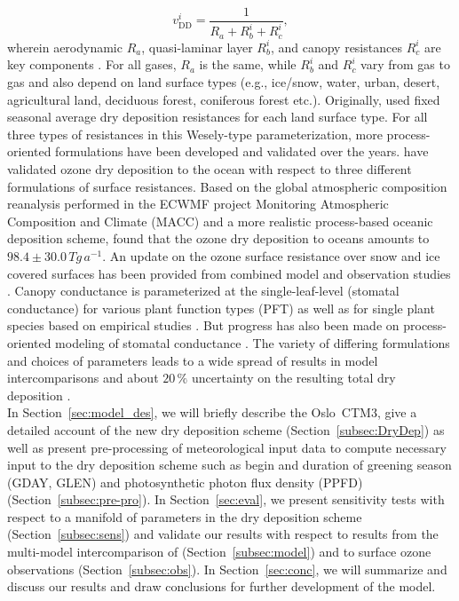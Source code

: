 \documentclass[gmd, manuscript]{copernicus}
\begin{document}
\begin{equation}
  v^i_\text{DD} = \frac{1}{R_a + R^i_b + R^i_c},
  \label{eq:drydep_velo}
\end{equation}
wherein aerodynamic $R_a$, quasi-laminar layer $R^i_b$, and canopy resistances $R^i_c$ are key components \citep{AE:Wesely1989,ACP:Seinfeld2006}. For all gases, $R_a$ is the same, while $R^i_b$ and $R^i_c$ vary from gas to gas and also depend on land surface types (e.g., ice/snow, water, urban, desert, agricultural land, deciduous forest, coniferous forest etc.). Originally, \citet{AE:Wesely1989} used fixed seasonal average dry deposition resistances for each land surface type. For all three types of resistances in this Wesely-type parameterization, more process-oriented formulations have been developed and validated over the years. \citet{ACP:Luhar2017} have validated ozone dry deposition to the ocean with respect to three different formulations of surface resistances.
Based on the global atmospheric composition reanalysis performed in the ECWMF project Monitoring Atmospheric Composition and Climate (MACC) \citep{MACC-II} and a more realistic process-based oceanic deposition scheme, \citet{ACP:Luhar2018} found that the ozone dry deposition to oceans amounts to $98.4 \pm 30.0\,\unit{Tg\,a^{-1}}$.
An update on the ozone surface resistance over snow and ice covered surfaces has been provided from combined model and observation studies \citep[][$v^\chem{O_3}_\text{ice/snow} = 1/10000\,\unit{m\,s^{-1}}$]{ACP:Helmig2007}. Canopy conductance is parameterized at the single-leaf-level (stomatal conductance) for various plant function types (PFT) as well as for single plant species based on empirical studies \citep{PTRS:Jarvis1976, BallBerry1987, ACP:Simpson2012, ICP:MappingManual2017}. But progress has also been made on process-oriented modeling of stomatal conductance \citep{AFM:Anderson2000,PP:Buckley2017}. The variety of differing formulations and choices of parameters leads to a wide spread of results in model intercomparisons \citep{ACP:Hardacre2015,AE:Derwent2018} and about $20\,\unit{\%}$ uncertainty on the resulting total dry deposition \citep{ACP:Monks2015}.\\

In Section~\ref{sec:model_des}, we will briefly describe the Oslo~CTM3, give a detailed account of the new dry deposition scheme (Section~\ref{subsec:DryDep}) as well as present pre-processing of meteorological input data to compute necessary input to the dry deposition scheme such as begin and duration of greening season (GDAY, GLEN) and photosynthetic photon flux density (PPFD) (Section~\ref{subsec:pre-pro}). In Section~\ref{sec:eval}, we present sensitivity tests with respect to a manifold of parameters in the dry deposition scheme (Section~\ref{subsec:sens}) and validate our results with respect to results from the multi-model intercomparison of \citet{ACP:Hardacre2015} (Section~\ref{subsec:model}) and to surface ozone observations (Section~\ref{subsec:obs}). In Section~\ref{sec:conc}, we will summarize and discuss our results and draw conclusions for further development of the model.
\end{document}
